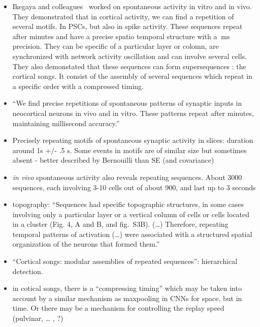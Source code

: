 \documentclass[brainsci, %
               review,submit,pdftex,moreauthors%
               ]{Definitions/mdpi}
\newcommand{\ms}{\si{\milli\second}}%
\begin{document}
\begin{itemize}
 \item
  Ikegaya and colleagues~\citep{ikegaya_synfire_2004} worked on spontaneous activity in vitro and in vivo. They demonstrated that in cortical activity, we can find a repetition of several motifs. In PSCs, but also in spike activity. These sequences repeat after minutes and have a precise spatio temporal structure with a $~\ms$ precision. They can be specific of a particular layer or colomn, are synchronized with network activity oscillation and can involve several cells. They also demonstated that these sequences can form supersequences : the cortical songs. It consist of the assembly of several sequences which repeat in a specific order with a compressed timing.
\item
  ``We find precise repetitions of spontaneous patterns of synaptic inputs in neocortical neurons in vivo and in vitro. These patterns repeat after minutes, maintaining millisecond accuracy.''
\item
  Precisely repeating motifs of spontaneous synaptic activity in slices: duration around 1s +/- .5 s. Some events in motifs are of similar size but sometimes absent - better described by Bernouilli than SE (and covariance)
\item
  \emph{in vivo} spontaneous activity also reveals repeating sequences. About 3000 sequences, each involving 3-10 cells out of about 900, and last up to 3 seconds
\item
  topography: ``Sequences had specific topographic structures, in some cases involving only a particular layer or a vertical column of cells or cells located in a cluster (Fig. 4, A and B, and fig.~S3B). (\ldots) Therefore, repeating temporal patterns of activation (\ldots) were associated with a structured spatial organization of the neurons that formed them.''
\item
  ``Cortical songs: modular assemblies of repeated sequences'': hierarchical detection.
\item
  in cotical songs, there is a ``compressing timing'' which may be taken into account by a similar mechanism as maxpooling in CNNs for space, but in time. Or there may be a mechanism for controlling the replay speed (pulvinar, \ldots{} , ?)
\end{itemize}
\end{document}
